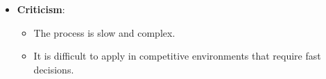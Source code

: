 \documentclass{article}
\begin{document}
\begin{itemize}
    \item \textbf{Criticism}:
    \begin{itemize}
        \item The process is slow and complex.
        \item It is difficult to apply in competitive environments that require fast decisions.
    \end{itemize}
\end{itemize}
\end{document}
